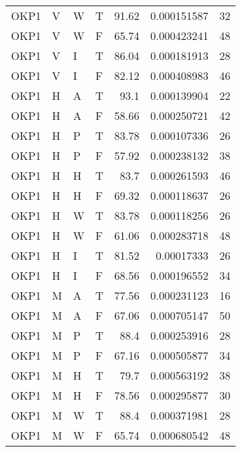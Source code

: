 \begin{longtable}{llllrrr}
    OKP1     & V     & W     & T          & 91.62      & 0.000151587 & 32       \\
    OKP1     & V     & W     & F          & 65.74      & 0.000423241 & 48       \\
    OKP1     & V     & I     & T          & 86.04      & 0.000181913 & 28       \\
    OKP1     & V     & I     & F          & 82.12      & 0.000408983 & 46       \\
    OKP1     & H     & A     & T          & 93.1       & 0.000139904 & 22       \\
    OKP1     & H     & A     & F          & 58.66      & 0.000250721 & 42       \\
    OKP1     & H     & P     & T          & 83.78      & 0.000107336 & 26       \\
    OKP1     & H     & P     & F          & 57.92      & 0.000238132 & 38       \\
    OKP1     & H     & H     & T          & 83.7       & 0.000261593 & 46       \\
    OKP1     & H     & H     & F          & 69.32      & 0.000118637 & 26       \\
    OKP1     & H     & W     & T          & 83.78      & 0.000118256 & 26       \\
    OKP1     & H     & W     & F          & 61.06      & 0.000283718 & 48       \\
    OKP1     & H     & I     & T          & 81.52      & 0.00017333  & 26       \\
    OKP1     & H     & I     & F          & 68.56      & 0.000196552 & 34       \\
    OKP1     & M     & A     & T          & 77.56      & 0.000231123 & 16       \\
    OKP1     & M     & A     & F          & 67.06      & 0.000705147 & 50       \\
    OKP1     & M     & P     & T          & 88.4       & 0.000253916 & 28       \\
    OKP1     & M     & P     & F          & 67.16      & 0.000505877 & 34       \\
    OKP1     & M     & H     & T          & 79.7       & 0.000563192 & 38       \\
    OKP1     & M     & H     & F          & 78.56      & 0.000295877 & 30       \\
    OKP1     & M     & W     & T          & 88.4       & 0.000371981 & 28       \\
    OKP1     & M     & W     & F          & 65.74      & 0.000680542 & 48       \\

\end{longtable}
